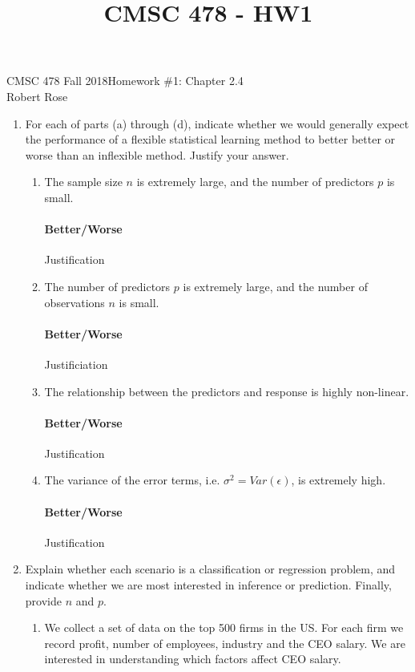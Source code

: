 \documentclass[12pt]{article}
\title{CMSC 478 - HW1}
\begin{document}
CMSC 478 Fall 2018\hfill Homework \#1: Chapter 2.4\\
Robert Rose

\hrulefill

\begin{enumerate}
\item For each of parts (a) through (d), indicate whether we would generally
      expect the performance of a flexible statistical learning method to better
      better or worse than an inflexible method. Justify your answer.
  \begin{enumerate}
  \item The sample size $n$ is extremely large, and the number of predictors
        $p$ is small.\\
  \vspace{-2.5em}
  \paragraph{Better/Worse} Justification

  \item The number of predictors $p$ is extremely large, and the number of
        observations $n$ is small.\\
  \vspace{-2.5em}
  \paragraph{Better/Worse} Justificiation

  \item The relationship between the predictors and response is highly non-linear.\\
  \vspace{-2.5em}
  \paragraph{Better/Worse} Justification

  \item The variance of the error terms, i.e. $\sigma^2 = Var(\epsilon)$, is extremely high.\\
  \vspace{-2.5em}
  \paragraph{Better/Worse} Justification
  \end{enumerate}

\item Explain whether each scenario is a classification or regression problem,
      and indicate whether we are most interested in inference or prediction.
      Finally, provide $n$ and $p$.
  \begin{enumerate}
    \item We collect a set of data on the top 500 firms in the US. For each firm
          we record profit, number of employees, industry and the CEO salary. We
          are interested in understanding which factors affect CEO salary.\\
    \vspace{-2.5em}

\end{enumerate}
\end{enumerate}
\end{document}
